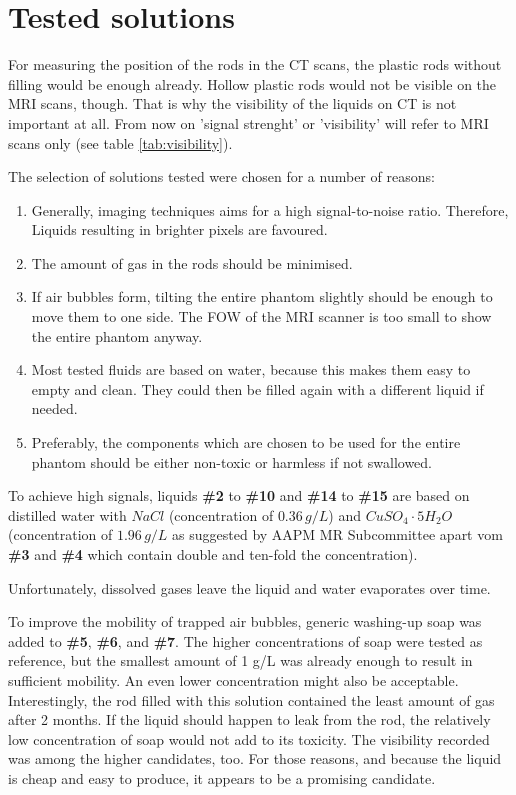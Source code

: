 \section{Tested solutions}
\newpage

For measuring the position of the rods in the CT scans, the plastic rods without filling would be enough already.
Hollow plastic rods would not be visible on the MRI scans, though.
That is why the visibility of the liquids on CT is not important at all.
From now on 'signal strenght' or 'visibility' will refer to MRI scans only (see table \ref{tab:visibility}).

The selection of solutions tested were chosen for a number of reasons:
\begin{enumerate}[label=\textbf{\arabic*.}]
\item Generally, imaging techniques aims for a high signal-to-noise ratio. Therefore, Liquids resulting in brighter pixels are favoured.
\item The amount of gas in the rods should be minimised.
\item If air bubbles form, tilting the entire phantom slightly should be enough to move them to one side. The FOW of the MRI scanner is too small to show the entire phantom anyway.
\item Most tested fluids are based on water, because this makes them easy to empty and clean.
They could then be filled again with a different liquid if needed.
\item Preferably, the components which are chosen to be used for the entire phantom should be either non-toxic or harmless if not swallowed.
\end{enumerate}


To achieve high signals, liquids \textbf{\#2} to \textbf{\#10} and \textbf{\#14} to \textbf{\#15} are based on distilled water with $NaCl$ (concentration of $0.36 \, g/L$) and $CuSO_4\cdot5H_2O$ (concentration of $1.96 \, g/L$ as suggested by AAPM MR Subcommittee \cite{Jackson2009} apart vom \textbf{\#3} and \textbf{\#4} which contain double and ten-fold the concentration).

Unfortunately, dissolved gases leave the liquid and water evaporates over time.

To improve the mobility of trapped air bubbles, generic washing-up soap was added to \textbf{\#5}, \textbf{\#6}, and \textbf{\#7}.
The higher concentrations of soap were tested as reference, but the smallest amount of 1 g/L was already enough to result in sufficient mobility.
An even lower concentration might also be acceptable.
Interestingly, the rod filled with this solution contained the least amount of gas after 2 months.
If the liquid should happen to leak from the rod, the relatively low concentration of soap would not add to its toxicity.
The visibility recorded was among the higher candidates, too.
For those reasons, and because the liquid is cheap and easy to produce, it appears to be a promising candidate.

